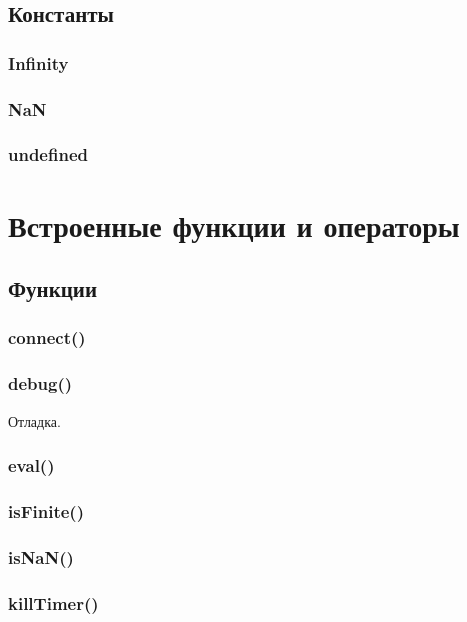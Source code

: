 \documentclass[11pt,russian,a4paper]{article}
\begin{document}
\subsection{Константы}


\subsubsection{Infinity}


\subsubsection{NaN}


\subsubsection{undefined}


\section{Встроенные функции и операторы}


\subsection{Функции}


\subsubsection{connect()}


\subsubsection{debug()}

Отладка.

\subsubsection{eval()}


\subsubsection{isFinite()}


\subsubsection{isNaN()}


\subsubsection{killTimer()}
\end{document}
